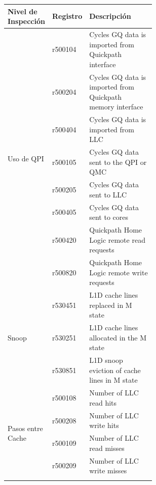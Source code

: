 \begin{table}[]
\centering
\begin{tabular}{|l|l|p{0.58\linewidth}|}
\hline
Nivel de Inspección                 & Registro & Descripción                                                \\ \hline
\multirow{8}{*}{Uso de QPI}         & r500104  & Cycles GQ data is imported from Quickpath interface        \\ \cline{2-3} 
                                    & r500204  & Cycles GQ data is imported from Quickpath memory interface \\ \cline{2-3} 
                                    & r500404  & Cycles GQ data is imported from LLC                        \\ \cline{2-3} 
                                    & r500105  & Cycles GQ data sent to the QPI or QMC                      \\ \cline{2-3} 
                                    & r500205  & Cycles GQ data sent to LLC                                 \\ \cline{2-3} 
                                    & r500405  & Cycles GQ data sent to cores                               \\ \cline{2-3} 
                                    & r500420  & Quickpath Home Logic remote read requests                  \\ \cline{2-3} 
                                    & r500820  & Quickpath Home Logic remote write requests                 \\ \hline
\multirow{3}{*}{Snoop}              & r530451  & L1D cache lines replaced in M state                        \\ \cline{2-3} 
                                    & r530251  & L1D cache lines allocated in the M state                   \\ \cline{2-3} 
                                    & r530851  & L1D snoop eviction of cache lines in M state               \\ \hline
\multirow{15}{*}{Pasos entre Cache} & r500108  & Number of LLC read hits                                    \\ \cline{2-3} 
                                    & r500208  & Number of LLC write hits                                   \\ \cline{2-3} 
                                    & r500109  & Number of LLC read misses                                  \\ \cline{2-3} 
                                    & r500209  & Number of LLC write misses                                 \\ \cline{2-3} 

\end{tabular}
\end{table}
